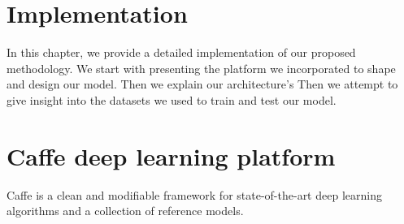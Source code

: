 
\section{Implementation}
\label{subsec:implementation}
\noindent

In this chapter, we provide a detailed implementation of our proposed methodology. We start with presenting the platform we incorporated to shape and design our model. Then we explain our architecture's 
Then we attempt to give insight into the datasets we used to train and test our model. 

\section{Caffe deep learning platform}

Caffe is a clean and modifiable framework for state-of-the-art deep learning algorithms and a collection of reference models.
\cite{jia2014caffe}